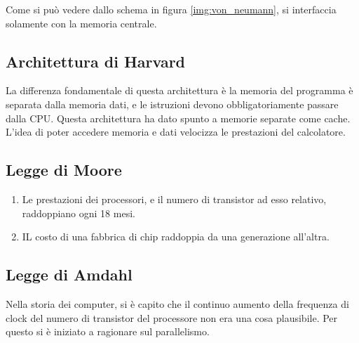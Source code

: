 \documentclass[../ace.tex]{subfiles}
\begin{document}
Come si può vedere dallo schema in figura \ref{img:von_neumann}, si interfaccia solamente con la memoria
centrale.

\subsection{Architettura di Harvard}
\begin{figure}[h]
    \centering
\end{figure}

\noindent La differenza fondamentale di questa architettura è la memoria del programma è separata dalla memoria dati, e le
istruzioni devono obbligatoriamente passare dalla CPU.
Questa architettura ha dato spunto a memorie separate come cache.
L'idea di poter accedere memoria e dati velocizza le prestazioni del calcolatore.

\subsection{Legge di Moore}
\begin{enumerate}
    \item Le prestazioni dei processori, e il numero di transistor ad esso relativo, raddoppiano ogni 18 mesi.
    \item IL costo di una fabbrica di chip raddoppia da una generazione all'altra.
\end{enumerate}

\subsection{Legge di Amdahl}
Nella storia dei computer, si è capito che il continuo aumento della frequenza di clock del numero di transistor del processore
non era una cosa plausibile. Per questo si è iniziato a ragionare sul parallelismo.
\end{document}
